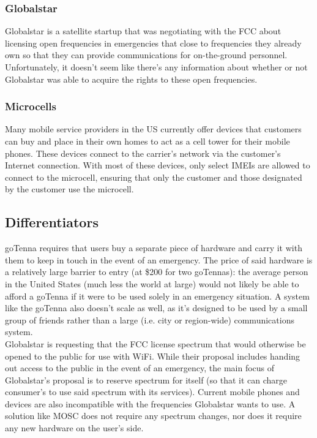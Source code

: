 \documentclass[10pt]{article}
\begin{document}
\subsubsection*{Globalstar}
Globalstar is a satellite startup that was negotiating with the FCC about
licensing open frequencies in emergencies that close to frequencies they already
own so that they can provide communications for on-the-ground personnel.
Unfortunately, it doesn't seem like there's any information about whether or not
Globalstar was able to acquire the rights to these open frequencies.

\subsubsection*{Microcells}
Many mobile service providers in the US currently offer devices that customers
can buy and place in their own homes to act as a cell tower for their mobile
phones.  These devices connect to the carrier's network via the customer's
Internet connection.  With most of these devices, only select IMEIs are allowed
to connect to the microcell, ensuring that only the customer and those
designated by the customer use the microcell.

\subsection*{Differentiators}
goTenna requires that users buy a separate piece of hardware and carry it with
them to keep in touch in the event of an emergency.  The price of said hardware
is a relatively large barrier to entry (at \$200 for two goTennas):  the average
person in the United States (much less the world at large) would not likely be
able to afford a goTenna if it were to be used solely in an emergency situation.
A system like the goTenna also doesn't scale as well, as it's designed to be
used by a small group of friends rather than a large (i.e. city or region-wide)
communications system.\\

Globalstar is requesting that the FCC license spectrum that would otherwise be
opened to the public for use with WiFi.  While their proposal includes handing
out access to the public in the event of an emergency, the main focus of
Globalstar's proposal is to reserve spectrum for itself (so that it can charge
consumer's to use said spectrum with its services).  Current mobile phones and
devices are also incompatible with the frequencies Globalstar wants to use.  A
solution like MOSC does not require any spectrum changes, nor does it require
any new hardware on the user's side.\\
\end{document}
